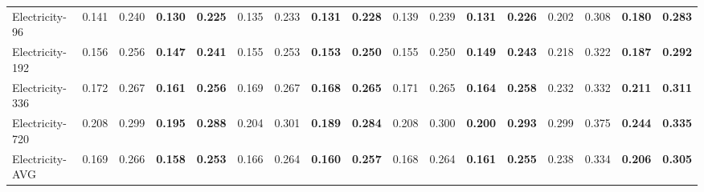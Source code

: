 \begin{table}[t]
{\begin{tabular}{lcccccccccccccccc}
Electricity-96  & 0.141 & 0.240 & \textbf{0.130} & \textbf{0.225} & 0.135 & 0.233 & \textbf{0.131} & \textbf{0.228} & 0.139 & 0.239 & \textbf{0.131} & \textbf{0.226} & 0.202 & 0.308 & \textbf{0.180} & \textbf{0.283} \\
Electricity-192 & 0.156 & 0.256 & \textbf{0.147} & \textbf{0.241} & 0.155 & 0.253 & \textbf{0.153} & \textbf{0.250} & 0.155 & 0.250 & \textbf{0.149} & \textbf{0.243} & 0.218 & 0.322 & \textbf{0.187} & \textbf{0.292} \\
Electricity-336 & 0.172 & 0.267 & \textbf{0.161} & \textbf{0.256} & 0.169 & 0.267 & \textbf{0.168} & \textbf{0.265} & 0.171 & 0.265 & \textbf{0.164} & \textbf{0.258} & 0.232 & 0.332 & \textbf{0.211} & \textbf{0.311} \\
Electricity-720 & 0.208 & 0.299 & \textbf{0.195} & \textbf{0.288} & 0.204 & 0.301 & \textbf{0.189} & \textbf{0.284} & 0.208 & 0.300 & \textbf{0.200} & \textbf{0.293} & 0.299 & 0.375 & \textbf{0.244} & \textbf{0.335} \\
Electricity-AVG & 0.169 & 0.266 & \textbf{0.158} & \textbf{0.253} & 0.166 & 0.264 & \textbf{0.160} & \textbf{0.257} & 0.168 & 0.264 & \textbf{0.161} & \textbf{0.255} & 0.238 & 0.334 & \textbf{0.206} & \textbf{0.305} \\
\bottomrule
\end{tabular}
}
\end{table}
